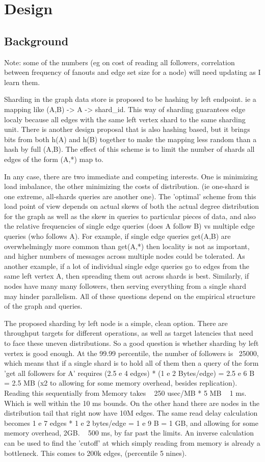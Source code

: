\documentclass[draft]{article}
\begin{document}
\section{Design}
\subsection{Background}
Note: some of the numbers (eg on cost of reading all followers, correlation between frequency of fanouts and edge set size for a node) will need updating as I learn them.

Sharding in the graph data store is proposed to be hashing by left endpoint.  ie a mapping like (A,B) -> A -> shard\_id. This way of sharding guarantees edge localy because all edges with the same left vertex shard to the same sharding unit.  There is another design proposal that is also hashing based, but it brings bits from both h(A) and h(B) together to make the mapping less random than a hash by full (A,B). The effect of this scheme is to limit the number of shards all edges of the form (A,*) map to.

In any case, there are two immediate and competing interests. One is minimizing load imbalance, the other minimizing the costs of distribution. (ie one-shard is one extreme, all-shards queries are another one). The 'optimal' scheme from this load point of view depends on actual skews of both the actual degree distribution for the graph as well as the skew in queries to particular pieces of data, and also the relative frequencies of single edge queries (does A follow B) vs multiple edge queries (who follows A).  For example, if single edge queries get(A,B) are overwhelmingly more common than get(A,*) then locality is not as important, and higher numbers of messages across multiple nodes could be tolerated.  As another example, if a lot of individual single edge queries go to edges from the same left vertex A, then spreading them out across shards is best.  Similarly, if nodes have many many followers, then serving everything from a single shard may hinder parallelism. All of these questions depend on the empirical structure of the graph and queries.

The proposed sharding by left node is a simple, clean option. There are throughput targets for different operations, as well as target latencies that need to face these uneven distributions. So a good question is whether sharding by left vertex is good enough. At the 99.99 percentile, the number of followers is ~25000, which means that if a single shard is to hold all of them then a query of the form 'get all followers for A'  requires (2.5 e 4 edges) * (1 e 2 Bytes/edge) = 2.5 e 6 B = 2.5 MB   (x2 to allowing for some memory overhead, besides replication).   Reading this sequentially from Memory takes ~ 250 usec/MB * 5 MB ~ 1 ms. Which is well within the 10 ms bounds.  On the other hand there are nodes in the distribution tail that right now have 10M edges. The same read delay calculation becomes 1 e 7 edges * 1 e 2 bytes/edge = 1 e 9 B = 1 GB, and allowing for some memory overhead, 2GB. ~  500 ms, by far past the limits.  An inverse calculation can be used to find the 'cutoff' at which simply reading from memory is already a bottleneck.  This comes to 200k edges, (percentile 5  nines).
\end{document}
